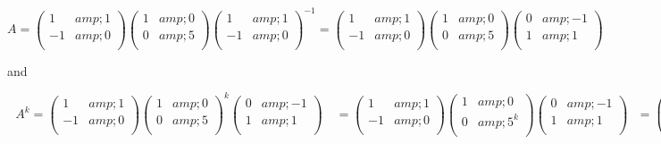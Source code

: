 \(A= \left(
\begin{array}{cc}
 1 &amp; 1 \\
 -1 &amp; 0 \\
\end{array}
\right)\left(
\begin{array}{cc}
 1 &amp; 0 \\
 0 &amp; 5 \\
\end{array}
\right)\left(
\begin{array}{cc}
 1 &amp; 1 \\
 -1 &amp; 0 \\
\end{array}
\right)^{-1}= \left(
\begin{array}{cc}
 1 &amp; 1 \\
 -1 &amp; 0 \\
\end{array}
\right)\left(
\begin{array}{cc}
 1 &amp; 0 \\
 0 &amp; 5 \\
\end{array}
\right)\left(
\begin{array}{cc}
 0 &amp; -1 \\
 1 &amp; 1 \\
\end{array}
\right)\)



and



\(\text{            }A^k= \left(
\begin{array}{cc}
 1 &amp; 1 \\
 -1 &amp; 0 \\
\end{array}
\right)\left(
\begin{array}{cc}
 1 &amp; 0 \\
 0 &amp; 5 \\
\end{array}
\right)^k\left(
\begin{array}{cc}
 0 &amp; -1 \\
 1 &amp; 1 \\
\end{array}
\right)\quad = \left(
\begin{array}{cc}
 1 &amp; 1 \\
 -1 &amp; 0 \\
\end{array}
\right)\left(
\begin{array}{cc}
 1 &amp; 0 \\
 0 &amp; 5^k \\
\end{array}
\right)\left(
\begin{array}{cc}
 0 &amp; -1 \\
 1 &amp; 1 \\
\end{array}
\right)\text{        }=\left(
\begin{array}{cc}
 5^k &amp; 5^k-1 \\
 0 &amp; 1 \\
\end{array}
\right)\)



